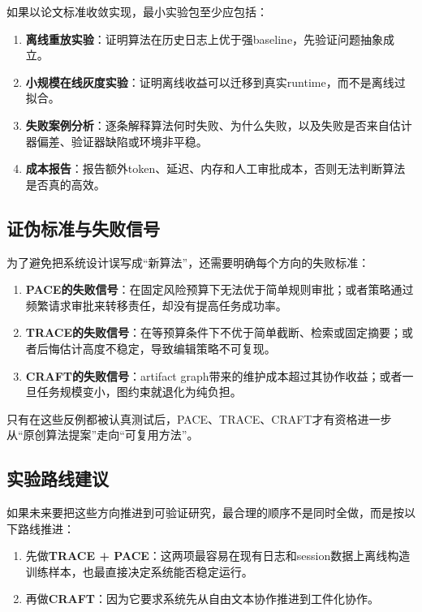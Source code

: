 \documentclass[12pt,a4paper]{article}
\begin{document}
如果以论文标准收敛实现，最小实验包至少应包括：

\begin{enumerate}
    \item \textbf{离线重放实验}：证明算法在历史日志上优于强baseline，先验证问题抽象成立。
    \item \textbf{小规模在线灰度实验}：证明离线收益可以迁移到真实runtime，而不是离线过拟合。
    \item \textbf{失败案例分析}：逐条解释算法何时失败、为什么失败，以及失败是否来自估计器偏差、验证器缺陷或环境非平稳。
    \item \textbf{成本报告}：报告额外token、延迟、内存和人工审批成本，否则无法判断算法是否真的高效。
\end{enumerate}

\subsection{证伪标准与失败信号}

为了避免把系统设计误写成“新算法”，还需要明确每个方向的失败标准：

\begin{enumerate}
    \item \textbf{PACE的失败信号}：在固定风险预算下无法优于简单规则审批；或者策略通过频繁请求审批来转移责任，却没有提高任务成功率。
    \item \textbf{TRACE的失败信号}：在等预算条件下不优于简单截断、检索或固定摘要；或者后悔估计高度不稳定，导致编辑策略不可复现。
    \item \textbf{CRAFT的失败信号}：artifact graph带来的维护成本超过其协作收益；或者一旦任务规模变小，图约束就退化为纯负担。
\end{enumerate}

只有在这些反例都被认真测试后，PACE、TRACE、CRAFT才有资格进一步从“原创算法提案”走向“可复用方法”。

\subsection{实验路线建议}

如果未来要把这些方向推进到可验证研究，最合理的顺序不是同时全做，而是按以下路线推进：

\begin{enumerate}
    \item 先做\textbf{TRACE + PACE}：这两项最容易在现有日志和session数据上离线构造训练样本，也最直接决定系统能否稳定运行。
    \item 再做\textbf{CRAFT}：因为它要求系统先从自由文本协作推进到工件化协作。
\end{enumerate}
\end{document}
